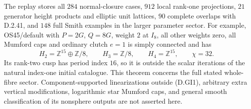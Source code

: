The replay 
stores all $284$ normal-closure cases, $912$ local
rank-one projections, $21$ generator height products
and elliptic unit lattices, $90$ complete overlaps
with D.2.41, and $148$ full Smith examples in the
larger parameter sector. For example, OS45/default
with $P=2G$, $Q=8G$, weight $2$ at $I_8$, all other
weights zero, all Mumford caps and ordinary clutch
$e=1$ is simply connected and has
\[
 H_2=\mathbb Z^{15}\oplus\mathbb Z/8,\qquad
 H_3=\mathbb Z/8,\qquad H_4=\mathbb Z^{15},\qquad\chi=32.
\]
Its rank-two cusp has period index $16$, so it is
outside the scalar iterations of the natural
index-one initial catalogue. This theorem concerns
the full stated whole-fibre sector. Component-supported
linearizations outside (D.GI1), arbitrary extra
vertical modifications, logarithmic star Mumford
caps, and general smooth classification of its
nonsphere outputs are not asserted here.
